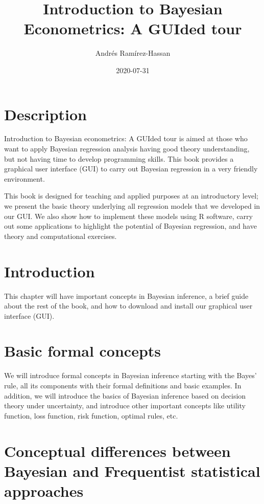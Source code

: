 \documentclass[
]{book}
\title{Introduction to Bayesian Econometrics: A GUIded tour}
\author{Andrés Ramírez-Hassan}
\date{2020-07-31}
\begin{document}
\maketitle

{
\setcounter{tocdepth}{1}
\tableofcontents
}
\hypertarget{description}{%
\chapter{Description}\label{description}}

Introduction to Bayesian econometrics: A GUIded tour is aimed at those who want to apply Bayesian regression analysis having good theory understanding, but not having time to develop programming skills. This book provides a graphical user interface (GUI) to carry out Bayesian regression in a very friendly environment.

This book is designed for teaching and applied purposes at an introductory level; we present the basic theory underlying all regression models that we developed in our GUI. We also show how to implement these models using R software, carry out some applications to highlight the potential of Bayesian regression, and have theory and computational exercises.

\hypertarget{intro}{%
\chapter{Introduction}\label{intro}}

This chapter will have important concepts in Bayesian inference, a brief guide about the rest of the book, and how to download and install our graphical user interface (GUI).

\hypertarget{basic-formal-concepts}{%
\chapter{Basic formal concepts}\label{basic-formal-concepts}}

We will introduce formal concepts in Bayesian inference starting with the Bayes' rule, all its components with their formal definitions and basic examples. In addition, we will introduce the basics of Bayesian inference based on decision theory under uncertainty, and introduce other important concepts like utility function, loss function, risk function, optimal rules, etc.

\hypertarget{conceptual-differences-between-bayesian-and-frequentist-statistical-approaches}{%
\chapter{Conceptual differences between Bayesian and Frequentist statistical approaches}\label{conceptual-differences-between-bayesian-and-frequentist-statistical-approaches}}
\end{document}
